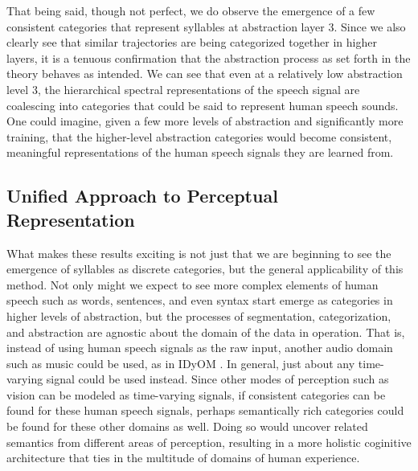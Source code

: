 That being said, though not perfect, we do observe the emergence of a few consistent categories that represent syllables at abstraction layer 3.  Since we also clearly see that similar trajectories are being categorized together in higher layers, it is a tenuous confirmation that the abstraction process as set forth in the theory behaves as intended.  We can see that even at a relatively low abstraction level 3, the hierarchical spectral representations of the speech signal are coalescing into categories that could be said to represent human speech sounds.  One could imagine, given a few more levels of abstraction and significantly more training, that the higher-level abstraction categories would become consistent, meaningful representations of the human speech signals they are learned from.

\subsection{Unified Approach to Perceptual Representation}
\label{section:unified-approach-to-perceptual-representation}

What makes these results exciting is not just that we are beginning to see the emergence of syllables as discrete categories, but the general applicability of this method.  Not only might we expect to see more complex elements of human speech such as words, sentences, and even syntax start emerge as categories in higher levels of abstraction, but the processes of segmentation, categorization, and abstraction are agnostic about the domain of the data in operation. That is, instead of using human speech signals as the raw input, another audio domain such as music could be used, as in IDyOM \citep{pearce2005construction}.  In general, just about any time-varying signal could be used instead.  Since other modes of perception such as vision can be modeled as time-varying signals, if consistent categories can be found for these human speech signals, perhaps semantically rich categories could be found for these other domains as well.  Doing so would uncover related semantics from different areas of perception, resulting in a more holistic coginitive architecture that ties in the multitude of domains of human experience.

